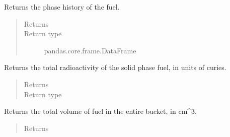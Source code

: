 \documentclass[letterpaper,10pt,openany,oneside,english]{sphinxmanual}
\begin{document}
\begin{fulllineitems}
\begin{fulllineitems}
\label{\detokenize{support_rst/fuel_bucket:fuel_bucket.FuelBucket.fuel_phase}}
Returns the phase history of the fuel.
\begin{quote}\begin{description}
\item[{Returns}] \leavevmode
{}

\item[{Return type}] \leavevmode
pandas.core.frame.DataFrame

\end{description}\end{quote}

\end{fulllineitems}


\begin{fulllineitems}
\label{\detokenize{support_rst/fuel_bucket:fuel_bucket.FuelBucket.fuel_radioactivity}}
Returns the total radioactivity of the solid phase fuel, in units of
curies.
\begin{quote}\begin{description}
\item[{Returns}] \leavevmode
{}

\item[{Return type}] \leavevmode
{}

\end{description}\end{quote}

\end{fulllineitems}


\begin{fulllineitems}
\label{\detokenize{support_rst/fuel_bucket:fuel_bucket.FuelBucket.fuel_volume}}
Returns the total volume of fuel in the entire bucket, in cm\textasciicircum{}3.
\begin{quote}\begin{description}
\item[{Returns}] \leavevmode
{}


\end{description}
\end{quote}
\end{fulllineitems}
\end{fulllineitems}
\end{document}
